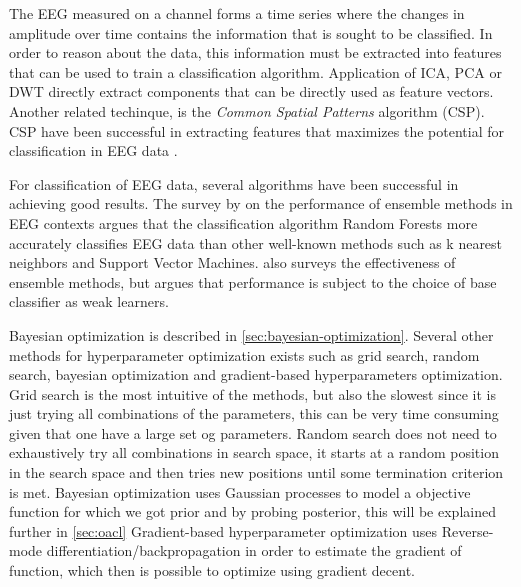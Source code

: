 The EEG measured on a channel forms a time series where the changes in amplitude over time contains the information that is sought to be classified. In order to reason about the data, this information must be extracted into features that can be used to train a classification algorithm. Application of ICA, PCA or DWT directly extract components that can be directly used as feature vectors. Another related techinque, is the \emph{Common Spatial Patterns} algorithm (CSP). CSP have been successful in extracting features that maximizes the potential for classification in EEG data \citep{ang2008filter,ang2012filter}.

For classification of EEG data, several algorithms have been successful in achieving good results. The survey by \citet{chan2015systematic} on the performance of ensemble methods in EEG contexts argues that the classification algorithm Random Forests more accurately classifies EEG data than other well-known methods such as k nearest neighbors and Support Vector Machines. \citet{sun2007experimental} also surveys the effectiveness of ensemble methods, but argues that performance is subject to the choice of base classifier as weak learners. 

Bayesian optimization is described in \cref{sec:bayesian-optimization}.
Several other methods for hyperparameter optimization exists such as grid search, random search, bayesian optimization and gradient-based hyperparameters optimization. Grid search is the most intuitive of the methods, but also the slowest since it is just trying all combinations of the parameters, this can be very time consuming given that one have a large set og parameters. Random search does not need to exhaustively try all combinations in search space, it starts at a random position in the search space and then tries new positions until some termination criterion is met. Bayesian optimization uses Gaussian processes to model a objective function for which we got prior and by probing posterior, this will be explained further in \cref{sec:oacl} Gradient-based hyperparameter optimization uses Reverse-mode differentiation/backpropagation in order to estimate the gradient of function, which then is possible to optimize using gradient decent.

